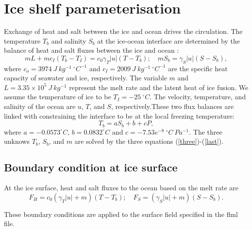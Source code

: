 \section{Ice shelf parameterisation}
Exchange of heat and salt between the ice and ocean drives the circulation.
The temperature $T_b$ and salinity $S_b$ at the ice-ocean interface are determined by the balance of heat and salt fluxes between the ice and ocean \cite[e.g.][]{mcpheebook,jenkins95}:
\begin{equation}
mL + mc_I(T_b-T_I)=c_0 \gamma_T |u| (T-T_b); \quad mS_b=\gamma_S |u| (S-S_b),
\label{three}
\end{equation}
where $c_o=3974~J~kg^{-1}~^\circ C^{-1}$ and $c_I=2009~J~kg^{-1}~^\circ C^{-1}$ are the specific heat capacity of seawater and ice, respectively. The variable $m$ and $L=3.35 \times 10^{5}~J~kg^{-1}$ represent the melt rate and the latent heat of ice fusion.
We assume the temperature of ice to be $T_I=-25~^\circ C $. The velocity, temperature, and salinity of the ocean are $u$, $T$, and $S$, respectively.These two flux balances are linked with constraining the interface to be at the local freezing temperature:
\begin{equation}
T_b = aS_b+b + cP,
\label{last}
\end{equation}
where $a=-0.0573 ^\circ C$, $b=0.0832 ^\circ C$ and $c=-7.53e^{-8}~^\circ C~Pa^{-1} $.
The three unknows $T_b$, $S_b$, and $m$ are solved by the three equations (\ref{three})-(\ref{last}). 

\subsection{Boundary condition at ice surface}
At the ice surface, heat and salt fluxes to the ocean based on the melt rate are
\begin{equation}
F_H = c_0(\gamma_T |u|+ m)(T-T_b); \quad F_S = (\gamma_S|u|+ m)(S-S_b).
\end{equation}

These boundary conditions are applied to the surface field specified in the flml file.





